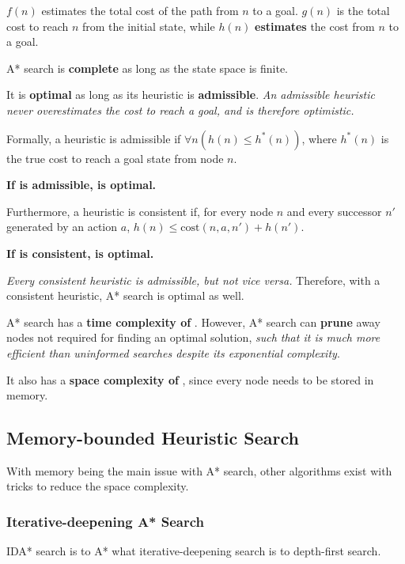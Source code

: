 \begin{multicols*}{2}
            $f(n)$ estimates the total cost of the path from $n$ to a goal. $g(n)$ is the total cost to reach $n$ from the initial state, while $h(n)$ \textbf{estimates} the cost from $n$ to a goal.

            A* search is \textbf{complete} as long as the state space is finite.

            It is \textbf{optimal} as long as its heuristic is \textbf{admissible}. \emph{An admissible heuristic never overestimates the cost to reach a goal, and is therefore optimistic.}

            Formally, a heuristic is admissible if $\forall n(h(n) \le h^*(n))$, where $h^*(n)$ is the true cost to reach a goal state from node $n$.

            \textbf{If  is admissible,  is optimal.}

            Furthermore, a heuristic is consistent if, for every node $n$ and every successor $n'$ generated by an action $a$, $h(n) \le \text{cost}(n, a, n') + h(n')$.

            \textbf{If  is consistent,  is optimal.}

            \emph{Every consistent heuristic is admissible, but not vice versa.} Therefore, with a consistent heuristic, A* search is optimal as well.

            A* search has a \textbf{time complexity of} . However, A* search can \textbf{prune} away nodes not required for finding an optimal solution, \emph{such that it is much more efficient than uninformed searches despite its exponential complexity}.

            It also has a \textbf{space complexity of} , since every node needs to be stored in memory.

        \subsection{Memory-bounded Heuristic Search}
            With memory being the main issue with A* search, other algorithms exist with tricks to reduce the space complexity.

            \subsubsection{Iterative-deepening A* Search}
            IDA* search is to A* what iterative-deepening search is to depth-first search.


\end{multicols*}
